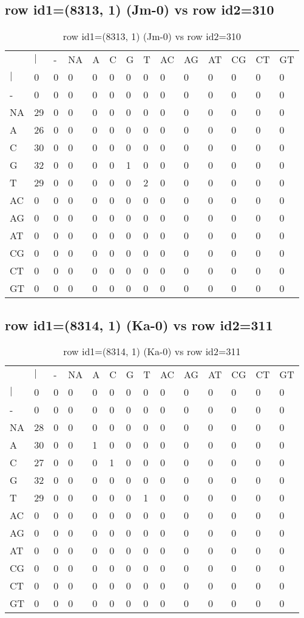\subsection{row id1=(8313, 1) (Jm-0) vs row id2=310}
\begin{center}
\begin{longtable}{|l|l|l|l|l|l|l|l|l|l|l|l|l|l|}
\caption{row id1=(8313, 1) (Jm-0) vs row id2=310} \label{table_dm306}\\
\hline
\\
\hline
&$|$&-&NA&A&C&G&T&AC&AG&AT&CG&CT&GT\\
$|$&0&0&0&0&0&0&0&0&0&0&0&0&0\\
-&0&0&0&0&0&0&0&0&0&0&0&0&0\\
NA&29&0&0&0&0&0&0&0&0&0&0&0&0\\
A&26&0&0&0&0&0&0&0&0&0&0&0&0\\
C&30&0&0&0&0&0&0&0&0&0&0&0&0\\
G&32&0&0&0&0&1&0&0&0&0&0&0&0\\
T&29&0&0&0&0&0&2&0&0&0&0&0&0\\
AC&0&0&0&0&0&0&0&0&0&0&0&0&0\\
AG&0&0&0&0&0&0&0&0&0&0&0&0&0\\
AT&0&0&0&0&0&0&0&0&0&0&0&0&0\\
CG&0&0&0&0&0&0&0&0&0&0&0&0&0\\
CT&0&0&0&0&0&0&0&0&0&0&0&0&0\\
GT&0&0&0&0&0&0&0&0&0&0&0&0&0\\
\hline
\end{longtable}
\end{center}

\subsection{row id1=(8314, 1) (Ka-0) vs row id2=311}
\begin{center}
\begin{longtable}{|l|l|l|l|l|l|l|l|l|l|l|l|l|l|}
\caption{row id1=(8314, 1) (Ka-0) vs row id2=311} \label{table_dm308}\\
\hline
\\
\hline
&$|$&-&NA&A&C&G&T&AC&AG&AT&CG&CT&GT\\
$|$&0&0&0&0&0&0&0&0&0&0&0&0&0\\
-&0&0&0&0&0&0&0&0&0&0&0&0&0\\
NA&28&0&0&0&0&0&0&0&0&0&0&0&0\\
A&30&0&0&1&0&0&0&0&0&0&0&0&0\\
C&27&0&0&0&1&0&0&0&0&0&0&0&0\\
G&32&0&0&0&0&0&0&0&0&0&0&0&0\\
T&29&0&0&0&0&0&1&0&0&0&0&0&0\\
AC&0&0&0&0&0&0&0&0&0&0&0&0&0\\
AG&0&0&0&0&0&0&0&0&0&0&0&0&0\\
AT&0&0&0&0&0&0&0&0&0&0&0&0&0\\
CG&0&0&0&0&0&0&0&0&0&0&0&0&0\\
CT&0&0&0&0&0&0&0&0&0&0&0&0&0\\
GT&0&0&0&0&0&0&0&0&0&0&0&0&0\\
\hline
\end{longtable}
\end{center}

